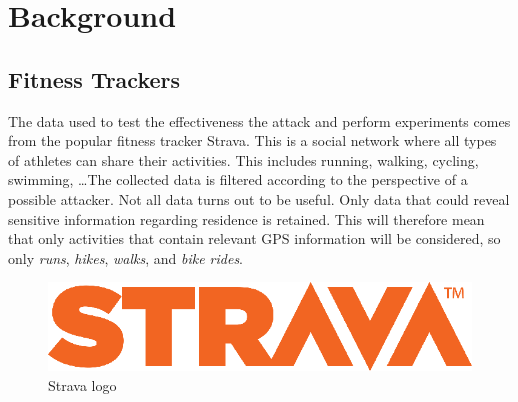 \documentclass[conference]{IEEEtran}
\begin{document}
\section{\textbf{Background}}
\subsection{Fitness Trackers}
The data used to test the effectiveness the attack and perform experiments
comes from the popular fitness tracker Strava. This is a
social network where all types of athletes can share their activities. This
includes running, walking, cycling, swimming, \ldots The collected data is
filtered according to the perspective of a possible attacker. Not all data
turns out to be useful. Only data that could reveal sensitive information
regarding residence is retained. This will therefore mean that only activities
that contain relevant GPS information will be considered, so only
\textit{runs}, \textit{hikes}, \textit{walks}, and \textit{bike rides}.
\begin{figure}[h]
    \centering
    \includegraphics[width=0.6\linewidth]{fig/Logo_Strava.png}
    \caption{Strava logo~\cite{strava_companie}}\label{fig:stravalogo}
\end{figure}
\end{document}
